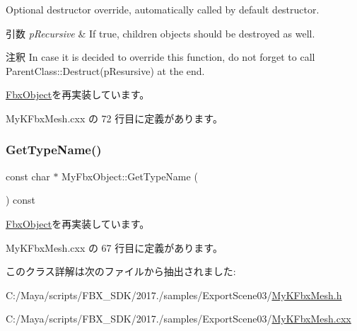 Optional destructor override, automatically called by default destructor. 
\begin{DoxyParams}{引数}
{\em p\+Recursive} & If true, children objects should be destroyed as well. \\
\hline
\end{DoxyParams}
\begin{DoxyRemark}{注釈}
In case it is decided to override this function, do not forget to call Parent\+Class\+::\+Destruct(p\+Resursive) at the end. 
\end{DoxyRemark}


\hyperlink{class_fbx_object_a123e084d9b32b29c28af6384b7c3c608}{Fbx\+Object}を再実装しています。



 My\+K\+Fbx\+Mesh.\+cxx の 72 行目に定義があります。

\mbox{\label{class_my_fbx_object_a83fae0bd93495a1cf431c00fbdf8be28}} 
\subsubsection{\texorpdfstring{Get\+Type\+Name()}{GetTypeName()}}
{\footnotesize\ttfamily const char $\ast$ My\+Fbx\+Object\+::\+Get\+Type\+Name (\begin{DoxyParamCaption}{ }\end{DoxyParamCaption}) const\hspace{0.3cm}{\ttfamily [virtual]}}



\hyperlink{class_fbx_object_a817dcfa8f7f7e2437324e1e71377c4b2}{Fbx\+Object}を再実装しています。



 My\+K\+Fbx\+Mesh.\+cxx の 67 行目に定義があります。



このクラス詳解は次のファイルから抽出されました\+:\begin{DoxyCompactItemize}
\item 
C\+:/\+Maya/scripts/\+F\+B\+X\+\_\+\+S\+D\+K/2017./samples/\+Export\+Scene03/\hyperlink{_my_k_fbx_mesh_8h}{My\+K\+Fbx\+Mesh.\+h}\item 
C\+:/\+Maya/scripts/\+F\+B\+X\+\_\+\+S\+D\+K/2017./samples/\+Export\+Scene03/\hyperlink{_my_k_fbx_mesh_8cxx}{My\+K\+Fbx\+Mesh.\+cxx}\end{DoxyCompactItemize}
